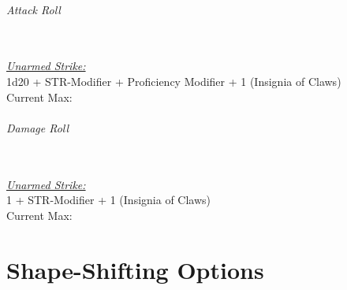 \documentclass[letterpaper,openany,oneside,twocolumn]{book}
\begin{document}
\paragraph*{Attack Roll}\hfill\\
\underline{\textit{Unarmed Strike:}}\\
1d20 + STR-Modifier + Proficiency Modifier + 1 (Insignia of Claws)\\
\indent Current Max: 
\paragraph*{Damage Roll}\hfill\\
\underline{\textit{Unarmed Strike:}}\\
1 + STR-Modifier + 1 (Insignia of Claws)\\
\indent Current Max: 

\part*{Shape-Shifting Options}
\end{document}
